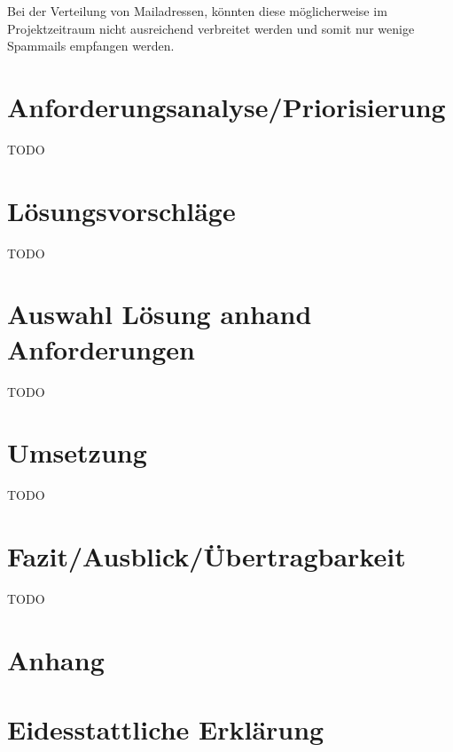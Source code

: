 \documentclass[a4paper,11pt,singlespacing]{article}
\begin{document}
	Bei der Verteilung von Mailadressen, könnten diese möglicherweise im Projektzeitraum nicht ausreichend verbreitet werden und somit nur wenige Spammails empfangen werden.


\section{Anforderungsanalyse/Priorisierung}\label{sec:AnforderungsanalysePriorisierung}
	TODO


\section{Lösungsvorschläge}\label{sec:Lösungsvorschläge}
	TODO


\section{Auswahl Lösung anhand Anforderungen}\label{sec:AuswahlLösungAnhandAnforderungen}
	TODO


\section{Umsetzung}\label{sec:Umsetzung}
	TODO


\section{Fazit/Ausblick/Übertragbarkeit}\label{sec:Fazit/Ausblick/Übertragbarkeit}
	TODO


\newpage



\listoffigures
{}

\lstlistoflistings
{}

\newpage

\section*{Anhang}\label{Anhang}

\newpage

\section*{Eidesstattliche Erklärung}\label{sec:Eidesstattliche Erklärung}
\end{document}
